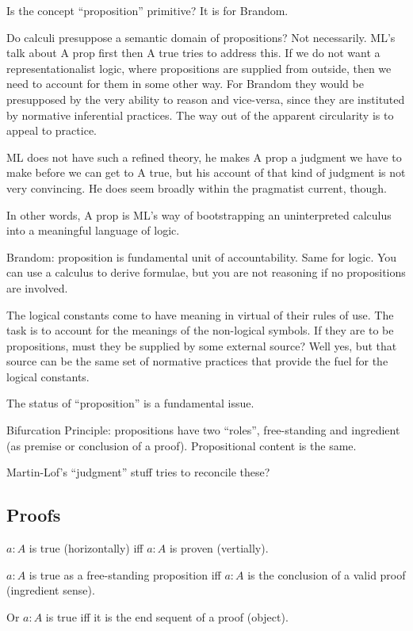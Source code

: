 Is the concept ``proposition'' primitive?  It is for Brandom.

Do calculi presuppose a semantic domain of propositions? Not
necessarily. ML's talk about A prop first then A true tries to address
this. If we do not want a representationalist logic, where
propositions are supplied from outside, then we need to account for
them in some other way. For Brandom they would be presupposed by the
very ability to reason and vice-versa, since they are instituted by
normative inferential practices. The way out of the apparent
circularity is to appeal to practice.

ML does not have such a refined theory, he makes A prop a judgment we
have to make before we can get to A true, but his account of that kind
of judgment is not very convincing. He does seem broadly within the
pragmatist current, though.

In other words, A prop is ML's way of bootstrapping an uninterpreted
calculus into a meaningful language of logic.

Brandom: proposition is fundamental unit of accountability. Same for
logic. You can use a calculus to derive formulae, but you are not
reasoning if no propositions are involved.

The logical constants come to have meaning in virtual of their rules
of use. The task is to account for the meanings of the non-logical
symbols. If they are to be propositions, must they be supplied by some
external source? Well yes, but that source can be the same set of
normative practices that provide the fuel for the logical constants.

The status of ``proposition'' is a fundamental issue.

Bifurcation Principle: propositions have two ``roles'', free-standing
and ingredient (as premise or conclusion of a proof). Propositional
content is the same.

Martin-Lof's ``judgment'' stuff tries to reconcile these?


\subsection{Proofs}


 \(a:A\) is true (horizontally) iff \(a:A\) is
proven (vertially).

 \(a:A\) is true as a free-standing proposition iff \(a:A\) is the
 conclusion of a valid proof (ingredient sense).

Or \(a:A\) is true iff it is the end sequent of a proof (object).

